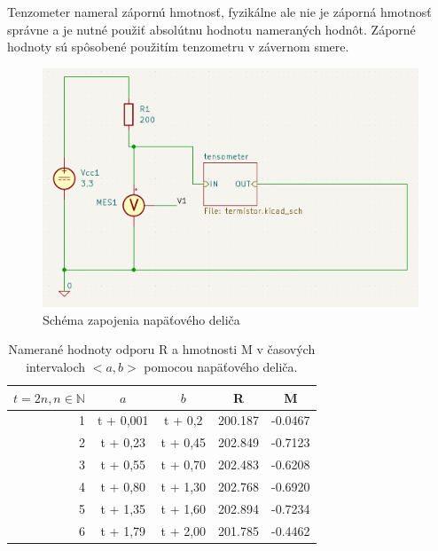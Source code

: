 Tenzometer nameral zápornú hmotnosť, fyzikálne ale nie je záporná hmotnosť správne a je nutné použiť absolútnu hodnotu nameraných hodnôt. Záporné hodnoty sú spôsobené použitím tenzometru v závernom smere.
\begin{figure}[H]
    \centering
    \includegraphics[width=0.7\linewidth]{fig/jedna.png}
    \caption{Schéma zapojenia napäťového deliča}
    \label{fig:enter-label}
\end{figure}
\begin{table}[H]
    \centering
    \begin{tabular}{|r|c|c|c|c|}
        \hline
         $t = 2n , n \in \mathbb{N}$ &  $a$ &  $b$ & R &M\\
        \hline
         1&  t + 0,001&  t + 0,2& 200.187&-0.0467\\
        \hline
         2&  t + 0,23&  t + 0,45&  202.849&-0.7123\\
        \hline
         3&  t + 0,55&  t + 0,70&  202.483&-0.6208\\
        \hline
         4&  t + 0,80&  t + 1,30&  202.768&-0.6920\\
        \hline
         5&  t + 1,35&  t + 1,60&  202.894&-0.7234\\
        \hline
         6&  t + 1,79&  t + 2,00&  201.785&-0.4462\\
        \hline
    \end{tabular}
    \caption{Namerané hodnoty odporu R a hmotnosti M v časových intervaloch $<a,b>$ pomocou napäťového deliča.}
    \label{t1}
\end{table}



